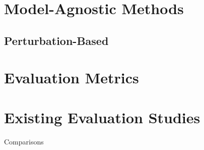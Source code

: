 \documentclass[main]{subfiles}
\begin{document}
\section{Model-Agnostic Methods}

\subsection{Perturbation-Based}


\section{Evaluation Metrics}



\section{Existing Evaluation Studies}

Comparisons
\end{document}
